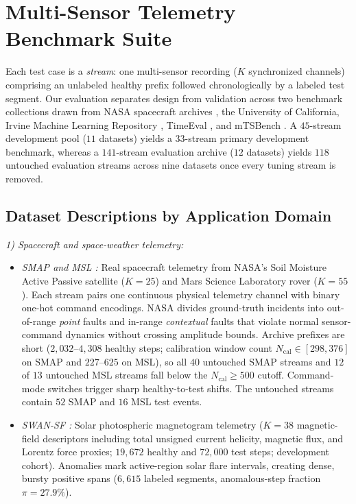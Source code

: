 \section{Multi-Sensor Telemetry Benchmark Suite}
\label{sec:dataset}

Each test case is a \emph{stream}: one multi-sensor recording ($K$ synchronized channels) comprising an unlabeled healthy prefix followed chronologically by a labeled test segment. Our evaluation separates design from validation across two benchmark collections drawn from NASA spacecraft archives \cite{Hundman2018b}, the University of California, Irvine Machine Learning Repository \cite{bachlin2010wearable, asuncion2007uci}, TimeEval \cite{schmidl2022anomaly}, and mTSBench \cite{zhou2026mtsbench}. A $45$-stream development pool ($11$ datasets) yields a $33$-stream primary development benchmark, whereas a $141$-stream evaluation archive ($12$ datasets) yields $118$ untouched evaluation streams across nine datasets once every tuning stream is removed.

\subsection{Dataset Descriptions by Application Domain}
\label{subsec:dataset_domains}

\noindent\emph{1) Spacecraft and space-weather telemetry:}
\begin{itemize}[leftmargin=*, nosep, itemsep=1.5pt]
    \item \emph{SMAP and MSL \cite{Hundman2018b}:} Real spacecraft telemetry from NASA's Soil Moisture Active Passive satellite ($K{=}25$) and Mars Science Laboratory rover ($K{=}55$). Each stream pairs one continuous physical telemetry channel with binary one-hot command encodings. NASA divides ground-truth incidents into out-of-range \emph{point} faults and in-range \emph{contextual} faults that violate normal sensor-command dynamics without crossing amplitude bounds. Archive prefixes are short ($2{,}032\text{--}4{,}308$ healthy steps; calibration window count $N_{\text{cal}}\in[298,376]$ on SMAP and $227\text{--}625$ on MSL), so all $40$ untouched SMAP streams and $12$ of $13$ untouched MSL streams fall below the $N_{\text{cal}}{\ge}500$ cutoff. Command-mode switches trigger sharp healthy-to-test shifts. The untouched streams contain $52$ SMAP and $16$ MSL test events.
    \item \emph{SWAN-SF \cite{angryk2020multivariate}:} Solar photospheric magnetogram telemetry ($K{=}38$ magnetic-field descriptors including total unsigned current helicity, magnetic flux, and Lorentz force proxies; $19{,}672$ healthy and $72{,}000$ test steps; development cohort). Anomalies mark active-region solar flare intervals, creating dense, bursty positive spans ($6{,}615$ labeled segments, anomalous-step fraction $\pi{=}27.9\%$).
\end{itemize}

